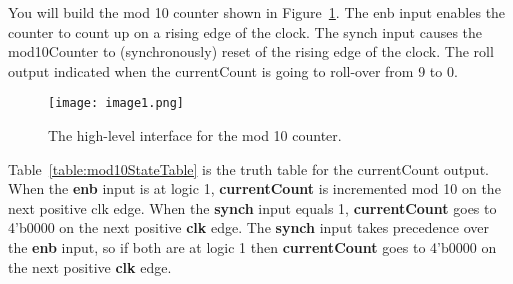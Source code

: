 You will build the mod 10 counter shown in Figure~\ref{fig:mod10Symbol}. The enb input
enables the counter to count up on a rising edge of the clock. The synch
input causes the mod10Counter to (synchronously) reset of the rising
edge of the clock. The roll output indicated when the currentCount is
going to roll-over from 9 to 0.

\begin{figure}[ht]
\texttt{[image: image1.png]}
\caption{The high-level interface for the mod 10 counter.}
\label{fig:mod10Symbol}
\end{figure}

Table~\ref{table:mod10StateTable} is the truth table for the currentCount output. When the
\textbf{enb} input is at logic 1, \textbf{currentCount} is incremented
mod 10 on the next positive clk edge. When the \textbf{synch} input
equals 1, \textbf{currentCount} goes to 4'b0000 on the next positive
\textbf{clk} edge. The \textbf{synch} input takes precedence over the
\textbf{enb} input, so if both are at logic 1 then \textbf{currentCount}
goes to 4'b0000 on the next positive \textbf{clk} edge.


